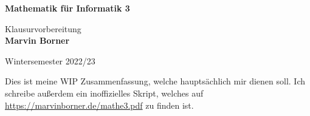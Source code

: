 \begin{titlepage}
	\begin{center}
		\vspace*{1cm}

		{\huge\textbf{Mathematik für Informatik 3}}

		\vspace{0.5cm}
		{\Large Klausurvorbereitung}\\
		\textbf{Marvin Borner}

		\vfill
		Wintersemester 2022/23
	\end{center}
\end{titlepage}

\pagebreak\hspace{0pt}\vfill\begin{center}{\Large Dies ist meine WIP Zusammenfassung, welche hauptsächlich mir dienen soll. Ich schreibe außerdem ein inoffizielles Skript, welches auf \url{https://marvinborner.de/mathe3.pdf} zu finden ist.}\end{center}\vfill\hspace{0pt}\pagebreak
